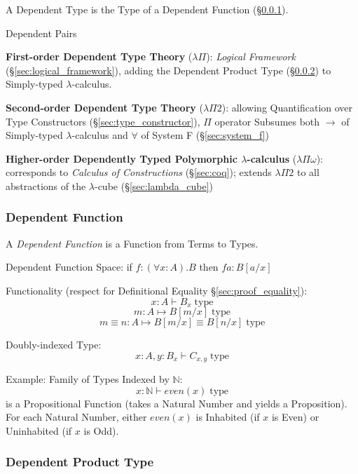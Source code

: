 A Dependent Type is the Type of a Dependent Function
(\S\ref{sec:dependent_function}).

Dependent Pairs

\textbf{First-order Dependent Type Theory} ($\lambda \Pi$):
\emph{Logical Framework} (\S\ref{sec:logical_framework}), adding the
Dependent Product Type (\S\ref{sec:dependent_product}) to Simply-typed
$\lambda$-calculus.

\textbf{Second-order Dependent Type Theory} ($\lambda \Pi 2$):
allowing Quantification over Type Constructors
(\S\ref{sec:type_constructor}), $\Pi$ operator Subsumes both
$\rightarrow$ of Simply-typed $\lambda$-calculus and $\forall$ of
System F (\S\ref{sec:system_f})

\textbf{Higher-order Dependently Typed Polymorphic $\lambda$-calculus}
($\lambda \Pi \omega$): corresponds to \emph{Calculus of
  Constructions} (\S\ref{sec:coq}); extends $\lambda \Pi 2$ to all
abstractions of the $\lambda$-cube (\S\ref{sec:lambda_cube})



\subsubsection{Dependent Function}\label{sec:dependent_function}

A \emph{Dependent Function} is a Function from Terms to Types.

Dependent Function Space: if $f:(\forall x: A).B$ then $f a : B[a/x]$

Functionality (respect for Definitional Equality
\S\ref{sec:proof_equality}):
\[
  x : A \vdash B_x \;\text{type}
\]\[
  m : A \mapsto B[m/x] \;\text{type}
\]\[
  m \equiv n : A \mapsto B[m/x] \equiv B[n/x] \;\text{type}
\]

Doubly-indexed Type:
\[
  x : A, y : B_x \vdash C_{x,y} \;\text{type}
\]

Example: Family of Types Indexed by $\mathbb{N}$:
\[
  x : \mathbb{N} \vdash even(x) \;\text{type}
\]
is a Propositional Function (takes a Natural Number and yields a
Proposition). For each Natural Number, either $even(x)$ is Inhabited
(if $x$ is Even) or Uninhabited (if $x$ is Odd).\cite{harper12}



\subsubsection{Dependent Product Type}\label{sec:dependent_product}


